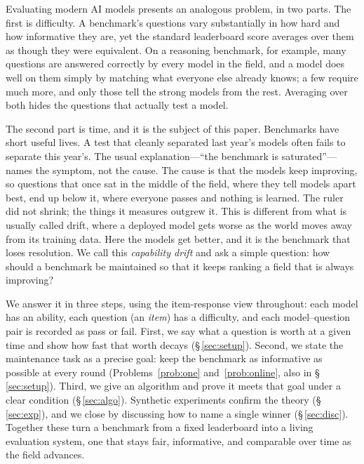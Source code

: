 \documentclass[11pt]{article}
\theoremstyle{plain}
\theoremstyle{definition}
\theoremstyle{remark}
\begin{document}
Evaluating modern AI models presents an analogous problem, in two parts. The first
is difficulty. A benchmark's questions vary substantially in how hard and how
informative they are, yet the standard leaderboard score averages over them as though
they were equivalent. On a reasoning benchmark, for example, many questions are
answered correctly by every model in the field, and a model does well on them simply
by matching what everyone else already knows; a few require much more, and only
those tell the strong models from the rest. Averaging over both hides the questions
that actually test a model.

The second part is time, and it is the subject of this paper. Benchmarks have short
useful lives. A test that cleanly separated last year's models often fails to
separate this year's. The usual explanation---``the benchmark is saturated''---names
the symptom, not the cause. The cause is that the models keep improving, so questions
that once sat in the middle of the field, where they tell models apart best, end up
below it, where everyone passes and nothing is learned. The ruler did not shrink; the
things it measures outgrew it. This is different from what is usually called drift,
where a deployed model gets worse as the world moves away from its training data.
Here the models get better, and it is the benchmark that loses resolution. We call
this \emph{capability drift} and ask a simple question: how should a benchmark be
maintained so that it keeps ranking a field that is always improving?

We answer it in three steps, using the item-response view throughout: each model has
an ability, each question (an \emph{item}) has a difficulty, and each model--question
pair is recorded as pass or fail. First, we say what a question is worth at a given
time and show how fast that worth decays (\S\,\ref{sec:setup}). Second, we state the
maintenance task as a precise goal: keep the benchmark as informative as possible at
every round (Problems~\ref{prob:one} and~\ref{prob:online}, also in
\S\,\ref{sec:setup}). Third, we give an algorithm and prove it meets that goal under
a clear condition (\S\,\ref{sec:algo}). Synthetic experiments confirm the theory
(\S\,\ref{sec:exp}), and we close by discussing how to name a single winner
(\S\,\ref{sec:disc}). Together these turn a benchmark from a fixed leaderboard into a
living evaluation system, one that stays fair, informative, and comparable over time
as the field advances.
\end{document}
